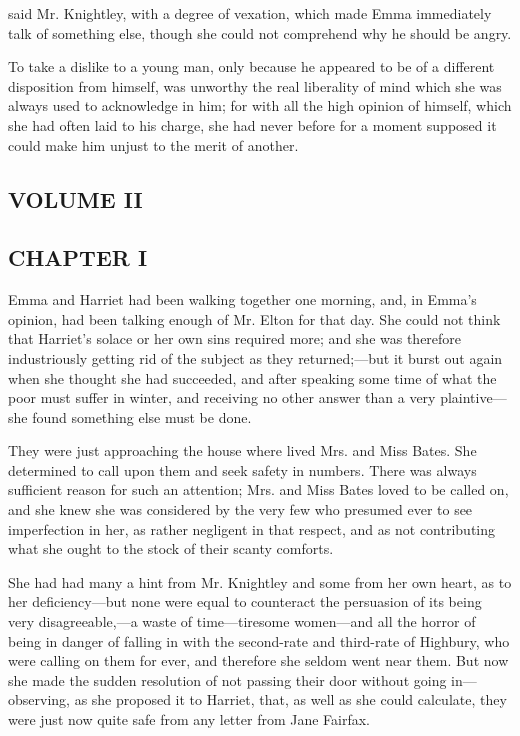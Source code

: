 
 said Mr. Knightley, with a degree of vexation, which made Emma immediately talk of something else, though she could not comprehend why he should be angry.

To take a dislike to a young man, only because he appeared to be of a different disposition from himself, was unworthy the real liberality of mind which she was always used to acknowledge in him; for with all the high opinion of himself, which she had often laid to his charge, she had never before for a moment supposed it could make him unjust to the merit of another.

\subsection[volume-ii]{\useURL[url19][][][]\from[url19]VOLUME II}

\subsection[chapter-i-1]{\useURL[url20][][][]\from[url20]CHAPTER I}

Emma and Harriet had been walking together one morning, and, in Emma's opinion, had been talking enough of Mr. Elton for that day. She could not think that Harriet's solace or her own sins required more; and she was therefore industriously getting rid of the subject as they returned;---but it burst out again when she thought she had succeeded, and after speaking some time of what the poor must suffer in winter, and receiving no other answer than a very plaintive--- she found something else must be done.

They were just approaching the house where lived Mrs. and Miss Bates. She determined to call upon them and seek safety in numbers. There was always sufficient reason for such an attention; Mrs. and Miss Bates loved to be called on, and she knew she was considered by the very few who presumed ever to see imperfection in her, as rather negligent in that respect, and as not contributing what she ought to the stock of their scanty comforts.

She had had many a hint from Mr. Knightley and some from her own heart, as to her deficiency---but none were equal to counteract the persuasion of its being very disagreeable,---a waste of time---tiresome women---and all the horror of being in danger of falling in with the second-rate and third-rate of Highbury, who were calling on them for ever, and therefore she seldom went near them. But now she made the sudden resolution of not passing their door without going in---observing, as she proposed it to Harriet, that, as well as she could calculate, they were just now quite safe from any letter from Jane Fairfax.

